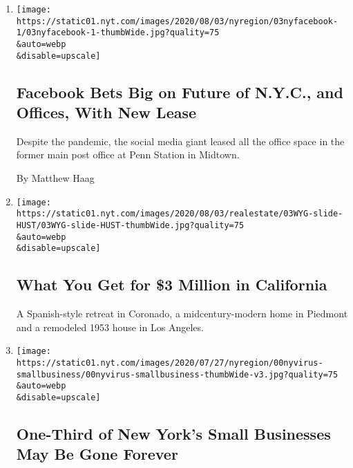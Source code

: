 \begin{enumerate}
\def\labelenumi{\arabic{enumi}.}
\item
  \href{/2020/08/03/nyregion/facebook-nyc-office-farley-building.html}{}

  \texttt{[image: https://static01.nyt.com/images/2020/08/03/nyregion/03nyfacebook-1/03nyfacebook-1-thumbWide.jpg?quality=75\\\&auto=webp\\\&disable=upscale]}

  \hypertarget{facebook-bets-big-on-future-of-nyc-and-offices-with-new-lease}{%
  \subsection{Facebook Bets Big on Future of N.Y.C., and Offices, With
  New
  Lease}\label{facebook-bets-big-on-future-of-nyc-and-offices-with-new-lease}}

  Despite the pandemic, the social media giant leased all the office
  space in the former main post office at Penn Station in Midtown.

  By Matthew Haag
\item
  \href{/slideshow/2020/08/03/realestate/what-you-get-for-3-million-in-california.html}{}

  \texttt{[image: https://static01.nyt.com/images/2020/08/03/realestate/03WYG-slide-HUST/03WYG-slide-HUST-thumbWide.jpg?quality=75\\\&auto=webp\\\&disable=upscale]}

  \hypertarget{what-you-get-for-3-million-in-california}{%
  \subsection{What You Get for \$3 Million in
  California}\label{what-you-get-for-3-million-in-california}}

  A Spanish-style retreat in Coronado, a midcentury-modern home in
  Piedmont and a remodeled 1953 house in Los Angeles.
\item
  \href{/2020/08/03/nyregion/nyc-small-businesses-closing-coronavirus.html}{}

  \texttt{[image: https://static01.nyt.com/images/2020/07/27/nyregion/00nyvirus-smallbusiness/00nyvirus-smallbusiness-thumbWide-v3.jpg?quality=75\\\&auto=webp\\\&disable=upscale]}

  \hypertarget{one-third-of-new-yorks-small-businesses-may-be-gone-forever}{%
  \subsection{One-Third of New York's Small Businesses May Be Gone
  Forever}\label{one-third-of-new-yorks-small-businesses-may-be-gone-forever}}


\end{enumerate}
